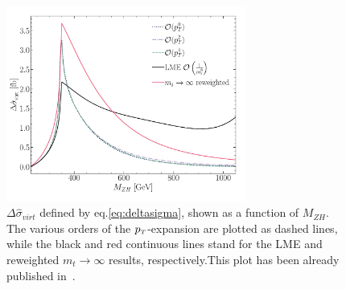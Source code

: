 \begin{figure}[th]
	\centering
	\includegraphics[width=0.7\textwidth]{./figures/sigma_part_virt_LMEreweighted.pdf}
	\caption{$\Delta \hat{\sigma}_{virt}$ defined by eq.\eqref{eq:deltasigma}, shown as a function of $M_{ZH}$. The various orders of the $p_{\scriptscriptstyle T}$-expansion are plotted as dashed lines, while the black and red continuous lines stand for the LME and  reweighted $m_t \rightarrow \infty$ results, respectively.This plot has been already published in~\cite{Alasfar:2021ppe}.}
	\label{fig:deltasigma}
\end{figure}

